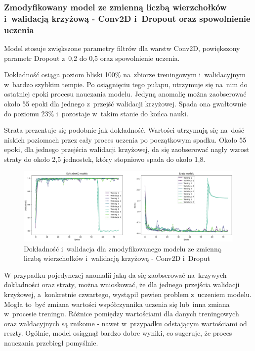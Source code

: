 \subsubsection{Zmodyfikowany model ze zmienną liczbą wierzchołków i~walidacją krzyżową - Conv2D i~Dropout oraz spowolnienie uczenia}

Model stosuje zwiększone parametry filtrów dla warstw Conv2D, powiększony parametr Dropout z~0,2 do 0,5
oraz spowolnienie uczenia.

Dokładność osiąga poziom bliski 100\% na~zbiorze treningowym i~walidacyjnym w~bardzo szybkim tempie.
Po osiągnięciu tego pułapu, utrzymuje się na~nim do ostatniej epoki procesu nauczania modelu.
Jedyną anomalię można zaobserować około 55 epoki dla jednego z~przejść walidacji krzyżowej.
Spada ona gwałtownie do poziomu 23\% i~pozostaje w~takim stanie do końca nauki.

Strata prezentuje się podobnie jak dokładność.
Wartości utrzymują się na~dość niskich poziomach przez cały proces uczenia po początkowym spadku.
Około 55 epoki, dla jednego przejścia walidacji krzyżowej,
da się zaobserować nagły wzrost straty do około 2,5 jednostek, który stopniowo spada do około 1,8.

\begin{figure}[ht]
	\centering
	\includegraphics[width=15.5cm]{resources/tests/images/v4/multiple_edges_crossvalid_1_img.png}
	\caption{Dokładność i~walidacja dla zmodyfikowanego modelu ze zmienną liczbą wierzchołków i~walidacją krzyżową - Conv2D i~Droput}
	\label{Fig:tests-csvar-1a}
\end{figure}
\FloatBarrier

W przypadku pojedynczej anomalii jaką da się zaobserować na~krzywych dokładności oraz straty,
można wnioskować, że dla jednego przejścia walidacji krzyżowej, a~konkretnie czwartego, wystąpił pewien problem z~uczeniem modelu.
Mogła to~być zmiana wartości współczynnika uczenia się lub~inna zmiana w~procesie treningu.
Różnice pomiędzy wartościami dla danych treningowych oraz waldacyjnych są znikome - nawet w~przypadku odstającym wartościami od reszty.
Ogólnie, model osiągnął bardzo dobre wyniki, co sugeruje, że proces nauczania przebiegł pomyślnie.


